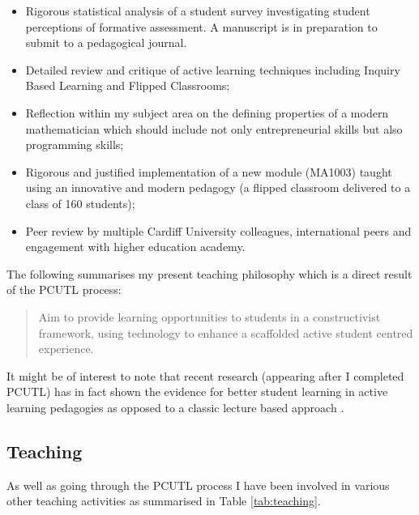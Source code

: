 \documentclass{article}
\begin{document}
\begin{itemize}
    \item Rigorous statistical analysis of a student survey investigating student perceptions of formative assessment. A manuscript is in preparation to submit to a pedagogical journal.
    \item Detailed review and critique of active learning techniques including Inquiry Based Learning and Flipped Classrooms;
    \item Reflection within my subject area on the defining properties of a modern mathematician which should include not only entrepreneurial skills but also programming skills;
    \item Rigorous and justified implementation of a new module (MA1003) taught using an innovative and modern pedagogy (a flipped classroom delivered to a class of 160 students);
    \item Peer review by multiple Cardiff University colleagues, international peers and engagement with higher education academy.
\end{itemize}

The following summarises my present teaching philosophy which is a direct result of the PCUTL process:

\begin{quote}
   Aim to provide learning opportunities to students in a constructivist framework, using technology to enhance a scaffolded active student centred experience.
\end{quote}

It might be of interest to note that recent research (appearing after I completed PCUTL) has in fact shown the evidence for better student learning in active learning pedagogies as opposed to a classic lecture based approach \cite{freeman_active_2014}.

\subsection{Teaching}

As well as going through the PCUTL process I have been involved in various other teaching activities as summarised in Table \ref{tab:teaching}.
\end{document}
